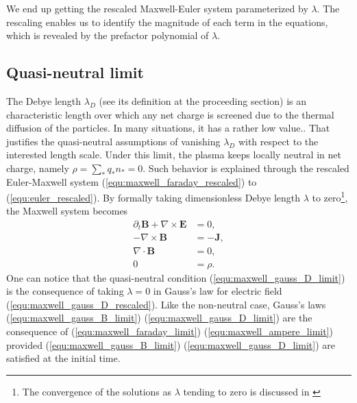 \documentclass{article}
\newcommand{\todo}[1]{\textcolor{blue}{\fbox{\textbf{TODO: #1}}}}
\begin{document}
We end up getting the rescaled Maxwell-Euler system parameterized by $\lambda$. The rescaling enables us to identify the magnitude of each term in the equations, which is revealed by the prefactor polynomial of $\lambda$.  

\subsection{Quasi-neutral limit} \label{sec:quasi-neutral_limit}
The Debye length $\lambda_D$ (see its definition at the proceeding section) is an characteristic length over which any net charge is screened due to the thermal diffusion of the particles. In many situations, it has a rather low value.\todo{Examples and typical values}. That justifies the quasi-neutral assumptions of vanishing $\lambda_D$ with respect to the interested length scale. Under this limit, the plasma keeps locally neutral in net charge, namely $\rho = \sum_* q_*n_* = 0$. Such behavior is explained through the rescaled Euler-Maxwell system (\ref{equ:maxwell_faraday_rescaled}) to (\ref{equ:euler_rescaled}). By formally taking dimensionless Debye length $\lambda$ to zero\footnote{The convergence of the solutions as $\lambda$ tending to zero is discussed in \cite[][chap. 2]{remi_2014}}, the Maxwell system becomes 
\begin{align}
    \partial_t \mathbf{B} + \nabla \times \mathbf{E} &= 0, \label{equ:maxwell_faraday_limit} \\ 
    - \nabla \times \mathbf{B} &= - \mathbf{J}, \label{equ:maxwell_ampere_limit} \\
    \nabla \cdot \mathbf{B} &= 0,  \label{equ:maxwell_gauss_B_limit}\\
     0 &= \rho. \label{equ:maxwell_gauss_D_limit}
\end{align}
One can notice that the quasi-neutral condition (\ref{equ:maxwell_gauss_D_limit}) is the consequence of taking $\lambda = 0$ in Gauss's law for electric field (\ref{equ:maxwell_gauss_D_rescaled}). Like the non-neutral case, Gauss's laws (\ref{equ:maxwell_gauss_B_limit}) (\ref{equ:maxwell_gauss_D_limit}) are the consequence of (\ref{equ:maxwell_faraday_limit}) (\ref{equ:maxwell_ampere_limit}) provided (\ref{equ:maxwell_gauss_B_limit}) (\ref{equ:maxwell_gauss_D_limit}) are satisfied at the initial time. 
\end{document}
